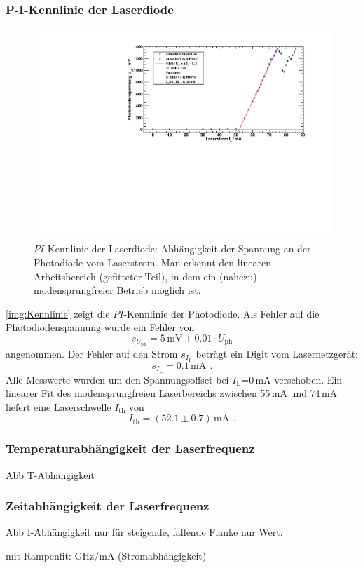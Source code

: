 \subsubsection*{P-I-Kennlinie der Laserdiode}
\begin{figure}[H]
\begin{center}
  \includegraphics[width=\textwidth]{../img/part1/diodenkennlinie.pdf}
  \caption{$PI$-Kennlinie der Laserdiode: Abhängigkeit der Spannung  %
  an der Photodiode vom Laserstrom. Man erkennt den linearen Arbeitsbereich (gefitteter Teil),
  in dem ein (nahezu) modensprungfreier Betrieb möglich ist.}
  \label{img:Kennlinie}
\end{center}
\end{figure} 
\autoref{img:Kennlinie} zeigt die $PI$-Kennlinie der Photodiode.
Als Fehler auf die Photodiodenspannung wurde ein Fehler von
\begin{equation}
  s_{U_{\text{ph}}}= 5\,\text{mV} + 0.01 \cdot U_{\text{ph}}
\end{equation}
angenommen.
Der Fehler auf den Strom $s_{I_{\text{L}}}$ beträgt ein Digit vom Lasernetzgerät:
\begin{equation}
  s_{I_{\text{L}}} = 0.1\,\text{mA} \ \, .
\end{equation}
Alle Messwerte wurden um den Spannungsoffset bei $I_{\text{L}}$=0\,mA verschoben.
Ein linearer Fit des modensprungfreien Laserbereichs zwischen 55\,mA und 74\,mA
liefert eine Laserschwelle $I_{\text{th}}$ von
\begin{equation}
  I_{\text{th}}=(52.1\pm0.7)\,\text{mA} \ \, .
\end{equation}

\subsubsection*{Temperaturabhängigkeit der Laserfrequenz}
Abb T-Abhängigkeit

\subsubsection*{Zeitabhängigkeit der Laserfrequenz} 

Abb I-Abhängigkeit nur für steigende,
fallende Flanke nur Wert.

mit Rampenfit: GHz/mA (Stromabhängigkeit)